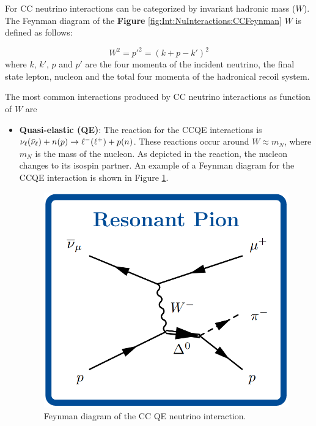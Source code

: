 For CC neutrino interactions can be categorized by invariant hadronic mass ($W$). The Feynman diagram of the \textbf{Figure} \ref{fig:Int:NuInteractions:CCFeynman} $W$ is defined as follows: 

\begin{equation}
    W^2 = p'^2 = (k +  p - k')^2
\end{equation}
 where $k$, $k'$, $p$ and $p'$ are the four momenta of the incident neutrino, the final state lepton, nucleon and the total four momenta of the hadronical recoil system. 

 The most common interactions produced by CC neutrino interactions as function of $W$ are 
 
\begin{itemize}
    \item \textbf{Quasi-elastic (QE)}: The reaction for the CCQE interactions is $\nu_\ell(\Bar{\nu}_\ell) + n(p)\rightarrow \ell^- (\ell^+) + p (n)$. These reactions occur around $W \approx m_N$, where $m_N$ is the mass of the nucleon. As depicted in the reaction, the nucleon changes to its isospin partner. An example of a Feynman diagram for the CCQE interaction is shown in Figure \ref{fig:Int:NuInteractions:CCQEFeynman}.

    \begin{figure}[!htb]
        \centering
        \includegraphics[scale=0.25]{Figures/Chapter1/ResonantChannel.png}
        \caption{Feynman diagram of the CC QE neutrino interaction.}
        \label{fig:Int:NuInteractions:CCQEFeynman}
    \end{figure}
    

\end{itemize}
